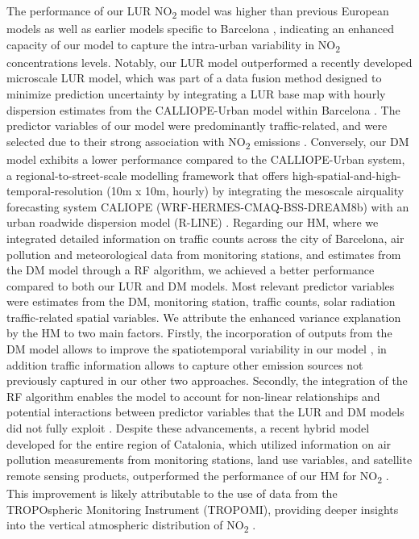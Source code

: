 \documentclass{article}
\begin{document}
The performance of our LUR NO\textsubscript{2} model was higher than previous European models \cite{rivera2012} as well as earlier models specific to Barcelona \cite{criado2023}, indicating an enhanced capacity of our model to capture the intra-urban variability in NO\textsubscript{2} concentrations levels. Notably, our LUR model outperformed a recently developed microscale LUR model, which was part of a data fusion method designed to minimize prediction uncertainty by integrating a LUR base map with hourly dispersion estimates from the CALLIOPE-Urban model within Barcelona \cite{criado2023}. The predictor variables of our model were predominantly traffic-related, and were selected due to their strong association with NO\textsubscript{2} emissions \cite{casallas2018}. Conversely, our DM model exhibits a lower performance compared to the CALLIOPE-Urban system, a regional-to-street-scale modelling framework that offers high-spatial-and-high-temporal-resolution (10m x 10m, hourly) by integrating the mesoscale airquality forecasting system CALIOPE (WRF-HERMES-CMAQ-BSS-DREAM8b) with an urban roadwide dispersion model (R-LINE) \cite{benavides2019}. Regarding our HM, where we integrated detailed information on traffic counts across the city of Barcelona, air pollution and meteorological data from monitoring stations, and estimates from the DM model through a RF algorithm, we achieved a better performance compared to both our LUR and DM models. Most relevant predictor variables were estimates from the DM, monitoring station, traffic counts, solar radiation traffic-related spatial variables. We attribute the enhanced variance explanation by the HM to two main factors. Firstly, the incorporation of outputs from the DM model allows to improve the spatiotemporal variability in our model \cite{michanowicz2016, korek2017}, in addition traffic information allows to capture other emission sources not previously captured \cite{pinto2020} in our other two approaches. Secondly, the integration of the RF algorithm enables the model to account for non-linear relationships and potential interactions between predictor variables that the LUR and DM models did not fully exploit \cite{araki2018, chen2019}. Despite these advancements, a recent hybrid model developed for the entire region of Catalonia, which utilized information on air pollution measurements from monitoring stations, land use variables, and satellite remote sensing products, outperformed the performance of our HM for NO\textsubscript{2} \cite{mila2023}. This improvement is likely attributable to the use of data from the TROPOspheric Monitoring Instrument (TROPOMI), providing deeper insights into the vertical atmospheric distribution of NO\textsubscript{2} \cite{petetin2023}.\\ 
\end{document}
